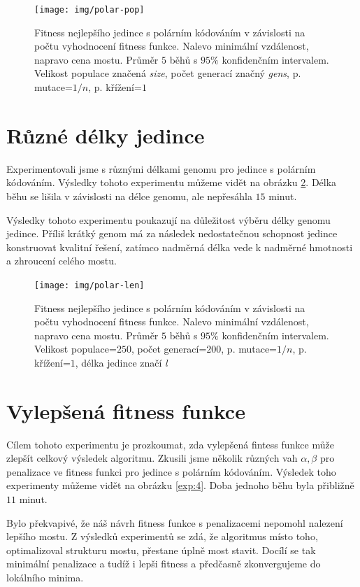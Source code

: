 \begin{figure}[p]\centering
\texttt{[image: img/polar-pop]}
\caption{Fitness nejlepšího jedince s polárním kódováním v závislosti na počtu vyhodnocení fitness funkce. Nalevo minimální vzdálenost, napravo cena mostu. Průměr $5$ běhů s $95\%$ konfidenčním intervalem. Velikost populace značená \emph{size}, počet generací značný \emph{gens}, p. mutace=$1/n$, p. křížení=$1$}
\label{exp:3}
\end{figure}

\section{Různé délky jedince}

Experimentovali jsme s různými délkami genomu pro jedince s polárním kódováním. Výsledky tohoto experimentu můžeme vidět na obrázku \ref{exp:35}. Délka běhu se lišila v závislosti na délce genomu, ale nepřesáhla $15$ minut.

Výsledky tohoto experimentu poukazují na důležitost výběru délky genomu jedince. Příliš krátký genom má za následek nedostatečnou schopnost jedince konstruovat kvalitní řešení, zatímco nadměrná délka vede k nadměrné hmotnosti a zhroucení celého mostu.

\begin{figure}[p]\centering
\texttt{[image: img/polar-len]}
\caption{Fitness nejlepšího jedince s polárním kódováním v závislosti na počtu vyhodnocení fitness funkce. Nalevo minimální vzdálenost, napravo cena mostu. Průměr $5$ běhů s $95\%$ konfidenčním intervalem. Velikost populace=$250$, počet generací=$200$, p. mutace=$1/n$, p. křížení=$1$, délka jedince značí \emph{l}}
\label{exp:35}
\end{figure}

\section{Vylepšená fitness funkce}

Cílem tohoto experimentu je prozkoumat, zda vylepšená fintess funkce může zlepšít celkový výsledek algoritmu. Zkusili jsme několik různých vah $\alpha, \beta$ pro penalizace ve fitness funkci pro jedince s polárním kódováním. Výsledek toho experimenty můžeme vidět na obrázku \ref{exp:4}. Doba jednoho běhu byla přibližně $11$ minut.

Bylo překvapivé, že náš návrh fitness funkce s penalizacemi nepomohl nalezení lepšího mostu. Z výsledků experimentů se zdá, že algoritmus místo toho, optimalizoval strukturu mostu, přestane úplně most stavit. Docílí se tak minimální penalizace a tudíž i lepši fitness a předčasně zkonvergujeme do lokálního minima. 

